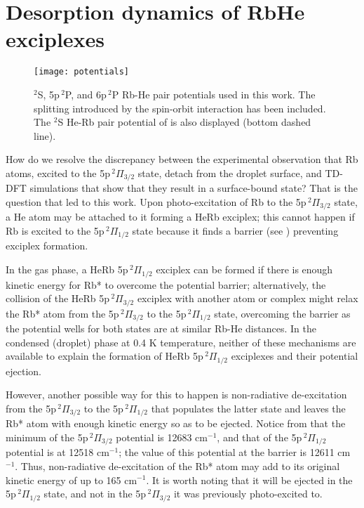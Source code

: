 \chapter{Desorption dynamics of RbHe exciplexes}

	\begin{figure}[t]
		\begin{center}
			\texttt{[image: potentials]}
		\end{center}
		\caption{$^2$S, 5p$\,^2$P, and 6p$\,^2$P Rb-He pair potentials used in this work. The splitting introduced by the spin-orbit interaction has been included. The $^2$S He-Rb pair potential of is also displayed (bottom dashed line).}
		\label{fig:potentials}
	\end{figure}

	How do we resolve the discrepancy between the experimental observation that Rb atoms, excited to the 5p$\,^2\Pi_{3/2}$ state, detach from the droplet surface, and TD-DFT simulations that show that they result in a surface-bound state? That is the question that led to this work. Upon photo-excitation of Rb to the 5p$\,^2\Pi_{3/2}$ state, a He atom may be attached to it forming a HeRb exciplex; this cannot happen if Rb is excited to the 5p$\,^2\Pi_{1/2}$ state because it finds a barrier (see ) preventing exciplex formation.

	In the gas phase, a HeRb 5p$\,^2\Pi_{1/2}$ exciplex can be formed if there is enough kinetic energy for Rb* to overcome the potential barrier; alternatively, the collision of the HeRb 5p$\,^2\Pi_{3/2}$ exciplex with another atom or complex might relax the Rb* atom from the 5p$\,^2\Pi_{3/2}$ to the 5p$\,^2\Pi_{1/2}$ state, overcoming the barrier as the potential wells for both states are at similar Rb-He distances. In the condensed (droplet) phase at 0.4 K temperature, neither of these mechanisms are available to explain the formation of HeRb 5p$\,^2\Pi_{1/2}$ exciplexes and their potential ejection.

	However, another possible way for this to happen is non-radiative de-excitation from the 5p$\,^2\Pi_{3/2}$ to the 5p$\,^2\Pi_{1/2}$ that populates the latter state and leaves the Rb* atom with enough kinetic energy so as to be ejected. Notice from  that the minimum of the 5p$\,^2\Pi_{3/2}$ potential is 12683 cm$^{-1}$, and that of the 5p$\,^2\Pi_{1/2}$ potential is at 12518 cm$^{-1}$; the value of this potential at the barrier is 12611 cm$^{-1}$. Thus, non-radiative de-excitation of the Rb* atom may add to its original kinetic energy of up to 165 cm$^{-1}$. It is worth noting that it will be ejected in the 5p$\,^2\Pi_{1/2}$ state, and not in the 5p$\,^2\Pi_{3/2}$ it was previously photo-excited to.


